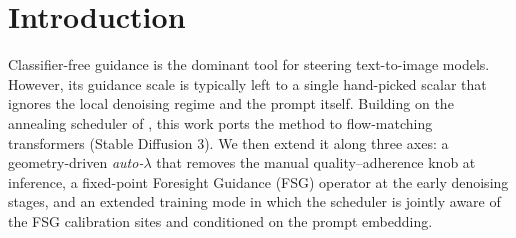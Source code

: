 \documentclass[acmtog]{acmart}
\begin{document}




\maketitle

\section{Introduction}
Classifier-free guidance is the dominant tool for steering text-to-image models.
However, its guidance scale is typically left to a single hand-picked scalar that ignores the local denoising regime and the prompt itself.
Building on the annealing scheduler of \citet{dahary2025annealing}, this work ports the method to flow-matching transformers (Stable Diffusion 3).
We then extend it along three axes: a geometry-driven \emph{auto-$\lambda$} that removes the manual quality--adherence knob at inference, a fixed-point Foresight Guidance (FSG) operator at the early denoising stages, and an extended training mode in which the scheduler is jointly aware of the FSG calibration sites and conditioned on the prompt embedding.
\end{document}
